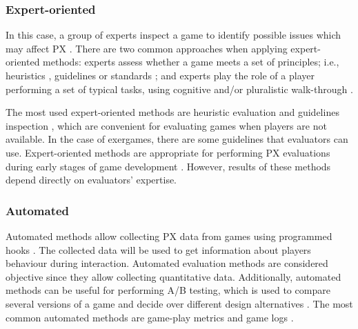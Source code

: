 \subsubsection{Expert-oriented}
In this case, a group of experts inspect a game to identify possible issues which may affect \ac{PX} \autocite{Bernhaupt2015,Yanez-Gomez2017}. There are two common approaches when applying expert-oriented methods: experts assess whether a game meets a set of principles; i.e., heuristics \autocite{Yanez-Gomez2017,Wiemeyer2016,Nacke2015,desurvire_methods_2013,Nackea,Nacke2009,Desurvire2009,Federoff2002}, guidelines or standards \autocite{Yanez-Gomez2017}; and experts play the role of a player performing a set of typical tasks, using cognitive and/or pluralistic walk-through \autocite{Yanez-Gomez2017}.

The most used expert-oriented methods are heuristic evaluation \autocite{Desurvire2009,Federoff2002,Hochleitner2015,Tondello2016} and guidelines inspection \autocite{Yanez-Gomez2017}, which are convenient for evaluating games when players are not available. In the case of exergames, there are some guidelines \autocite{Wiemeyer2015,Pasch2009,Isbister2015,Mueller2014} that evaluators can use. Expert-oriented methods are appropriate for performing \ac{PX} evaluations during early stages of game development \autocite{Bernhaupt2015,McAllister2015,desurvire_methods_2013}. However, results of these methods depend directly on evaluators’ expertise. 

\subsubsection{Automated}
Automated methods allow collecting \ac{PX} data from games using programmed hooks \autocite{Nacke2015}. The collected data will be used to get information about players behaviour during interaction. Automated evaluation methods are considered objective since they allow collecting quantitative data. Additionally, automated methods can be useful for performing A/B testing, which is used to compare several versions of a game and decide over different design alternatives \autocite{desurvire_methods_2013}. The most common automated methods are game-play metrics \autocite{Nacke2015} and game logs \autocite{Drachen2013,Wiemeyer2016}.

